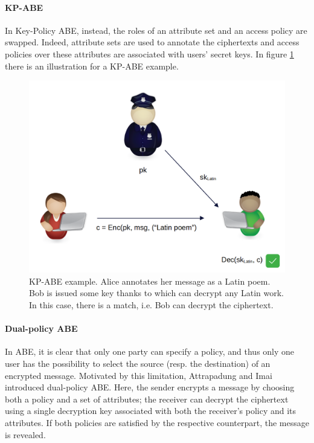 \paragraph*{KP-ABE}
In Key-Policy ABE, instead, the roles of an attribute set and an access policy are swapped.
Indeed, attribute sets are used to annotate the ciphertexts and access policies over these attributes are associated with users’ secret keys.
In figure \ref{fig:kp_abe_example} there is an illustration for a KP-ABE example.
\begin{figure}[ht]
    \centering
    \includegraphics[width=0.8\linewidth]{images/kp_abe.png}
    \caption{KP-ABE example. Alice annotates her message as a Latin poem. Bob is issued some key thanks to which can decrypt any Latin work. In this case, there is a match, i.e. Bob can decrypt the ciphertext.}
    \label{fig:kp_abe_example}
\end{figure}

\paragraph*{Dual-policy ABE}
In ABE, it is clear that only one party can specify a policy, and thus only one user has the possibility to select the source (resp. the destination) of an encrypted message.
Motivated by this limitation, Attrapadung and Imai \cite{Attrapadung} introduced dual-policy ABE.
Here, the sender encrypts a message by choosing both a policy and a set of attributes; the receiver can decrypt the ciphertext using a single decryption key associated with both the receiver's policy and its attributes.
If both policies are satisfied by the respective counterpart, the message is revealed.
